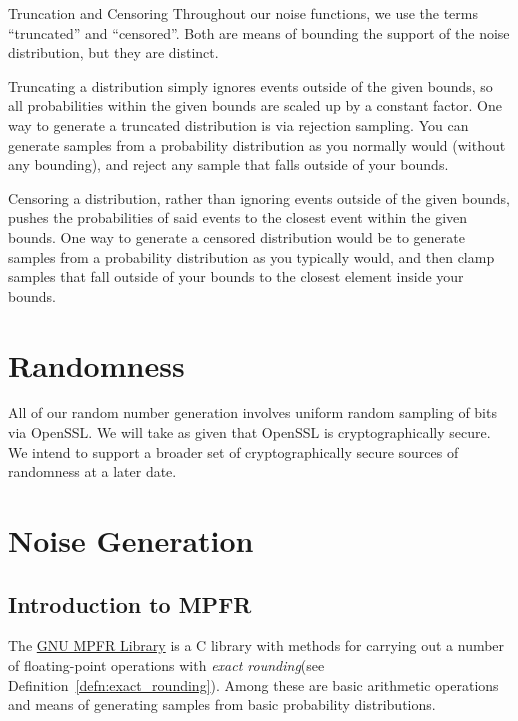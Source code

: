 \documentclass[11pt]{scrartcl} %
\begin{document}
\begin{definition}
	\label{def:truncation_censoring}
	Truncation and Censoring \newline
	Throughout our noise functions, we use the terms ``truncated'' and ``censored''.
	Both are means of bounding the support of the noise distribution, but they are distinct. \newline

	Truncating a distribution simply ignores events outside of the given bounds, so
	all probabilities within the given bounds are scaled up by a constant factor.
	One way to generate a truncated distribution is via rejection sampling.
	You can generate samples from a probability distribution as you normally would (without any bounding),
	and reject any sample that falls outside of your bounds. \newline

	Censoring a distribution, rather than ignoring events outside of the given bounds, pushes the
	probabilities of said events to the closest event within the given bounds. One way to generate
	a censored distribution would be to generate samples from a probability distribution as you
	typically would, and then clamp samples that fall outside of your bounds to the closest element
	inside your bounds.
\end{definition}

\section{Randomness}
All of our random number generation involves uniform random sampling of bits via OpenSSL.
We will take as given that OpenSSL is cryptographically secure. We intend to support a broader set 
of cryptographically secure sources of randomness at a later date.

\section{Noise Generation}

\subsection{Introduction to MPFR}
The \href{https://www.mpfr.org/}{GNU MPFR Library}\cite{FHL+07} is a C library with methods for carrying out a number
of floating-point operations with \emph{exact rounding}(see Definition~\ref{defn:exact_rounding}).
Among these are basic arithmetic operations and means of generating samples from basic probability distributions. \newline 
\end{document}
